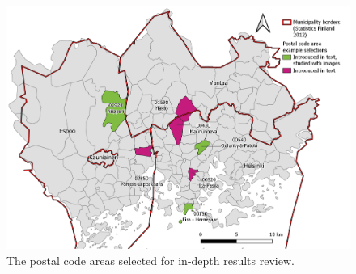\begin{figure}[H]%
    \centering
    \includegraphics[trim={0 0.2cm 0 0},clip,width=\textwidth]{images/results_comparison_examplezips.png}
    \caption[Postal code areas selected for in-depth results review]{The postal code areas selected for in-depth results review.}%
    \label{fig:ykrzone_selections_map}%
\end{figure}

